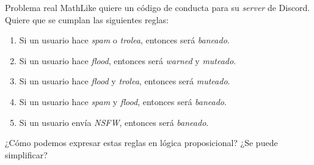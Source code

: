 \documentclass[dvisvgm,hypertex,aspectratio=169]{beamer}
\begin{document}
\begin{frame}{Problema real}
  MathLike quiere un código de conducta para su \textit{server} de Discord. Quiere que se cumplan las siguientes reglas:

  \begin{enumerate}[<+->]
    \item Si un usuario hace \textit{spam} o \textit{trolea}, entonces será \textit{baneado}.
    \item Si un usuario hace \textit{flood}, entonces será \textit{warned} y \textit{muteado}.
    \item Si un usuario hace \textit{flood} y \textit{trolea}, entonces será \textit{muteado}.
    \item Si un usuario hace \textit{spam} y \textit{flood}, entonces será \textit{baneado}.
    \item Si un usuario envía \textit{NSFW}, entonces será \textit{baneado}.
  \end{enumerate}

  ¿Cómo podemos expresar estas reglas en lógica proposicional? ¿Se puede simplificar?
\end{frame}
\end{document}
